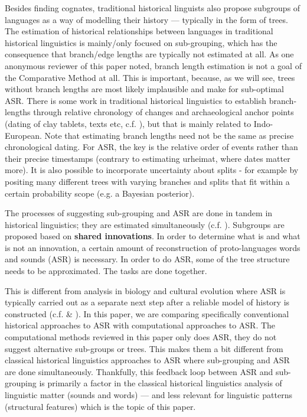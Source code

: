 \documentclass[12pt,letterpaper]{article}
\begin{document}
Besides finding cognates, traditional historical linguists also propose subgroups of languages as a way of modelling their history --- typically in the form of trees. The estimation of historical relationships between languages in traditional historical linguistics is mainly/only focused on sub-grouping, which has the consequence that branch/edge lengths are typically not estimated at all. As one anonymous reviewer of this paper noted, branch length estimation is not a goal of the Comparative Method at all. This is important, because, as we will see, trees without branch lengths are most likely implausible and make for sub-optimal ASR. There is some work in traditional historical linguistics to establish branch-lengths through relative chronology of changes and archaeological anchor points (dating of clay tablets, texts etc, c.f. \citet{pereltsvaig2015indo_dates}), but that is mainly related to Indo-European. Note that estimating branch lengths need not be the same as precise chronological dating. For ASR, the key is the relative order of events rather than their precise timestamps (contrary to estimating urheimat, where dates matter more). It is also possible to incorporate uncertainty about splits - for example by positing many different trees with varying branches and splits that fit within a certain probability scope (e.g. a Bayesian posterior).

The processes of suggesting sub-grouping and ASR are done in tandem in historical linguistics; they are estimated simultaneously (c.f. \citet[7]{protooceanicvol1}
). Subgroups are proposed based on \textbf{shared innovations}. In order to determine what is and what is not an innovation, a certain amount of reconstruction of proto-languages words and sounds (ASR) is necessary. In order to do ASR, some of the tree structure needs to be approximated. The tasks are done together.

This is different from analysis in biology and cultural evolution where ASR is typically carried out as a separate next step after a reliable model of history is constructed (c.f. \citet{holland2020accuracy} \& \citet{evans2021uses}). In this paper, we are comparing specifically conventional historical approaches to ASR with computational approaches to ASR. The computational methods reviewed in this paper only does ASR, they do not suggest alternative sub-groups or trees. This makes them a bit different from classical historical linguistics approaches to ASR where sub-grouping and ASR are done simultaneously. Thankfully, this feedback loop between ASR and sub-grouping is primarily a factor in the classical historical linguistics analysis of linguistic matter (sounds and words) --- and less relevant for linguistic patterns (structural features) which is the topic of this paper.
\end{document}
